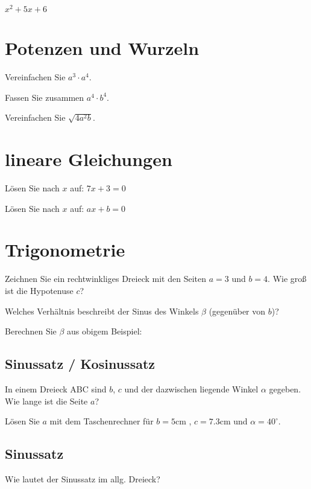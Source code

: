 $x^2 + 5x + 6$ 


\noTRAINER{\newpage}

\section{Potenzen und Wurzeln}
Vereinfachen Sie $a^3 \cdot{} a^4$. 

Fassen Sie zusammen $a^4 \cdot{} b^4$. 

Vereinfachen Sie $\sqrt{4a^2b}$. 

\section{lineare Gleichungen}
Lösen Sie nach $x$ auf: $7x+3=0$ 

Lösen Sie nach $x$ auf: $ax + b = 0$ 

\section{Trigonometrie}
Zeichnen Sie ein rechtwinkliges Dreieck mit den Seiten $a=3$ und $b=4$.
Wie groß ist die Hypotenuse $c$? 

Welches Verhältnis beschreibt der Sinus des Winkels $\beta$ (gegenüber von $b$)?

Berechnen Sie $\beta$ aus obigem Beispiel: 


\subsection{Sinussatz / Kosinussatz}
In einem Dreieck ABC sind $b$, $c$ und der dazwischen liegende Winkel $\alpha$ gegeben. Wie lange ist die Seite $a$?

Lösen Sie $a$ mit dem Taschenrechner für $b=5$cm , $c=7.3$cm und $\alpha=40^{\circ{}}$. 

\subsection{Sinussatz}
Wie lautet der Sinussatz im allg. Dreieck?

